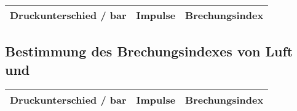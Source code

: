 \begin{table}[H]
	\centering	
	\begin{tabular}{ccc}
		Druckunterschied / \si{\bar} & Impulse & Brechungsindex \\
		\hline
		
	\end{tabular}
	\label{tab:BrechungsindexLuft}
\end{table}

\subsection{Bestimmung des Brechungsindexes von Luft und }
\begin{table}[H]
	\centering
	\begin{tabular}{ccc}
		Druckunterschied / \si{\bar} & Impulse & Brechungsindex \\
		\hline
		
	\end{tabular}
	\label{tab:BrechungsindexCO2}
\end{table}









